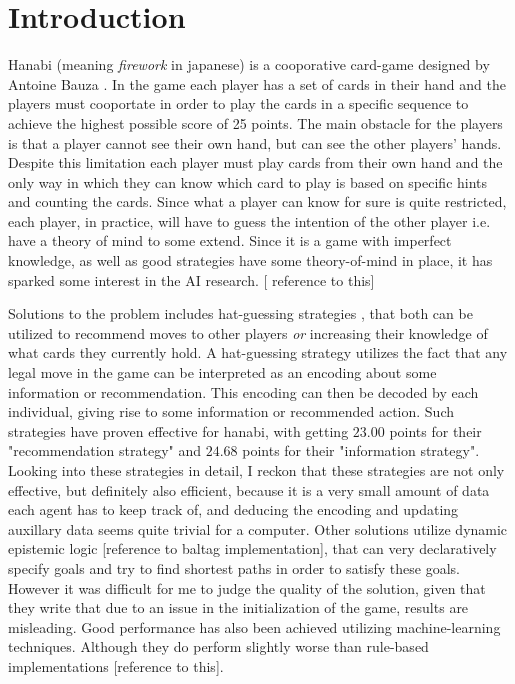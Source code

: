\section{Introduction}

Hanabi (meaning \emph{firework} in japanese) is a cooporative card-game designed by Antoine Bauza \cite{BGGHanabi}. In the game each player has a set of cards in their hand and the players must cooportate in order to play the cards in a specific sequence to achieve the highest possible score of 25 points.
The main obstacle for the players is that a player cannot see their own hand, but can see the other players' hands. 
Despite this limitation each player must play cards from their own hand and the only way in which they can know which card to play is based on specific hints and counting the cards. 
Since what a player can know for sure is quite restricted, each player, in practice, will have to guess the intention of the other player i.e. have a theory of mind to some extend. 
Since it is a game with imperfect knowledge, as well as good strategies have some theory-of-mind in place, it has sparked some interest in the AI research. [ reference to this]

Solutions to the problem includes hat-guessing strategies \cite{CoxEtAl2015}, that both can be utilized to recommend moves to other players \emph{or} increasing their knowledge of what cards they currently hold. 
A hat-guessing strategy utilizes the fact that any legal move in the game can be interpreted as an encoding about some information or recommendation.
This encoding can then be decoded by each individual, giving rise to some information or recommended action. 
Such strategies have proven effective for hanabi, with \cite{CoxEtAl2015} getting $23.00$ points for their "recommendation strategy" and $24.68$ points for their "information strategy". 
Looking into these strategies in detail, I reckon that these strategies are not only effective, but definitely also efficient, because it is a very small amount of data each agent has to keep track of, and deducing the encoding and updating auxillary data seems quite trivial for a computer.
Other solutions utilize dynamic epistemic logic [reference to baltag implementation], that can very declaratively specify goals and try to find shortest paths in order to satisfy these goals. However it was difficult for me to judge the quality of the solution, given that they write that due to an issue in the initialization of the game, results are misleading.
Good performance has also been achieved utilizing machine-learning techniques. Although they do perform slightly worse than rule-based implementations [reference to this].

